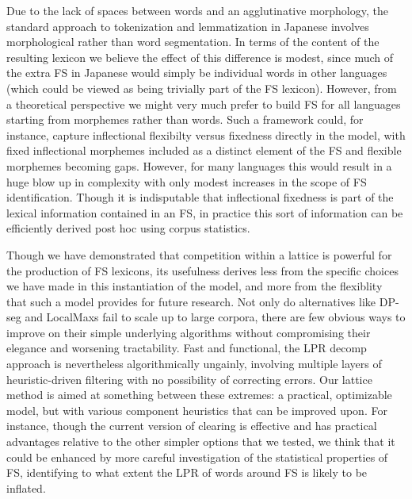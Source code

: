 \documentclass[11pt,letterpaper]{article}
\begin{document}
Due to the lack of spaces between words and an agglutinative morphology, the standard approach to tokenization and lemmatization in Japanese involves morphological rather than word segmentation. In terms of the content of the resulting lexicon we believe the effect of this difference is modest, since much of the extra FS in Japanese would simply be individual words in other languages (which could be viewed as being trivially part of the FS lexicon). However, from a theoretical perspective we might very much prefer to build FS for all languages starting from morphemes rather than words. Such a framework could, for instance, capture inflectional flexibilty versus fixedness directly in the model, with fixed inflectional morphemes included as a distinct element of the FS and flexible morphemes becoming gaps. However, for many languages this would result in a huge blow up in complexity with only modest increases in the scope of FS identification. Though it is indisputable that inflectional fixedness is part of the lexical information contained in an FS, in practice this sort of information can be efficiently derived post hoc using corpus statistics.

Though we have demonstrated that competition within a lattice is powerful for the production of FS lexicons, its usefulness derives less from the specific choices we have made in this instantiation of the model, and more from the flexiblity that such a model provides for future research. Not only do alternatives like DP-seg and LocalMaxs fail to scale up to large corpora, there are few obvious ways to improve on their simple underlying algorithms without compromising their elegance and worsening tractability. Fast and functional, the LPR decomp approach is nevertheless algorithmically ungainly, involving multiple layers of heuristic-driven filtering with no possibility of correcting errors. Our lattice method is aimed at something between these extremes: a practical, optimizable model, but with various component heuristics that can be improved upon. For instance, though the current version of clearing is effective and has practical advantages relative to the other simpler options that we tested, we think that it could be enhanced by more careful investigation of the statistical properties of FS, identifying to what extent the LPR of words around FS is likely to be inflated.
\end{document}
